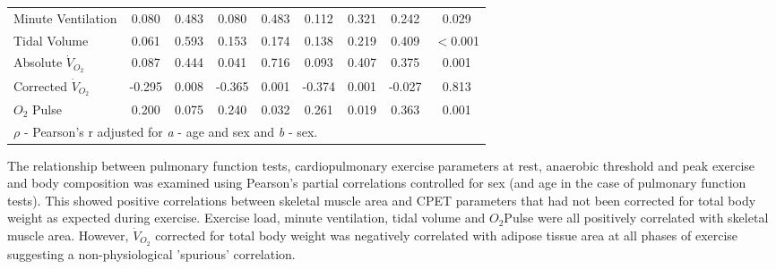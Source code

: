 \begin{table}[p]
\begin{tabular}{|l| c c | c c | c c | c c|}
		Minute Ventilation        & 0.080  & 0.483                     & 0.080  & 0.483                     & 0.112  & 0.321                     & 0.242  & 0.029                       \\
		Tidal Volume              & 0.061  & 0.593                     & 0.153  & 0.174                     & 0.138  & 0.219                     & 0.409  & $<$0.001                    \\
		Absolute $\dot{V}_{O_2}$  & 0.087  & 0.444                     & 0.041  & 0.716                     & 0.093  & 0.407                     & 0.375  & 0.001                       \\
		Corrected $\dot{V}_{O_2}$ & -0.295 & 0.008                     & -0.365 & 0.001                     & -0.374 & 0.001                     & -0.027 & 0.813                       \\
		$O_2$ Pulse               & 0.200  & 0.075                     & 0.240  & 0.032                     & 0.261  & 0.019                     & 0.363  & 0.001                       \\ \hline
		\multicolumn{9}{l}{$\rho$ - Pearson's r adjusted for \textit{a} - age and sex and \textit{b} - sex.}
	\end{tabular}
	\medskip
	\begin{flushleft}
		The relationship between pulmonary function tests, cardiopulmonary exercise parameters at rest, anaerobic threshold and peak exercise and body composition was examined using Pearson's partial correlations controlled for sex (and age in the case of pulmonary function tests). This showed positive correlations between skeletal muscle area and CPET parameters that had not been corrected for total body weight as expected during exercise. Exercise load, minute ventilation, tidal volume and ${O_2}$Pulse were all positively correlated with skeletal muscle area. However, $\dot{V}_{O_2}$ corrected for total body weight was negatively correlated with adipose tissue area at all phases of exercise suggesting a non-physiological 'spurious' correlation.
	\end{flushleft}
\end{table}